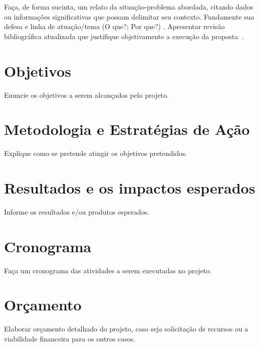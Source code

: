 \documentclass[a4paper,11pt]{article}
\begin{document}
Faça, de forma sucinta, um relato da situação-problema abordada, citando dados ou informações significativas que possam delimitar seu contexto. Fundamente sua defesa e linha de atuação/tema (O que?; Por que?) . Apresentar revisão bibliográfica atualizada que justifique objetivamente a execução da proposta~\cite{identifier}.


\section{Objetivos}
Enuncie os objetivos a serem alcançados pelo projeto.


\section{Metodologia e Estratégias de Ação}
Explique como se pretende atingir os objetivos pretendidos. 


\section{Resultados e os impactos esperados}
Informe os resultados e/ou produtos esperados. 

\section{Cronograma}
Faça um cronograma das atividades a serem executadas no projeto. 

\section{Orçamento}

Elaborar orçamento detalhado do projeto, caso seja solicitação de recursos ou a viabilidade financeira para os outros casos.



\end{document}
